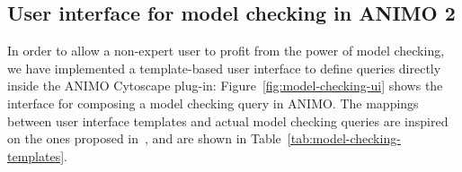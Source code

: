 \documentclass{bmcart}
\def\animo2{ANIMO 2}
\begin{document}



\subsection*{User interface for model checking in \animo2{}}\label{sec:animo-model-checking-ui}
In order to allow a non-expert user to profit from the power of model checking, we have implemented
a template-based user interface to define queries directly inside the ANIMO Cytoscape plug-in:
Figure~\ref{fig:model-checking-ui} shows the interface for composing a model checking query in ANIMO.
The mappings between user interface templates and actual model checking queries are inspired
on the ones proposed in~\cite{hidde-templates}, and are shown in Table~\ref{tab:model-checking-templates}.
\end{document}
